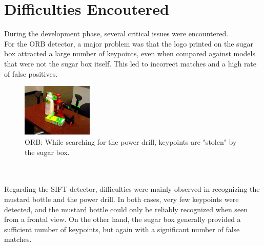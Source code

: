 \documentclass[10.5pt,a4paper]{article}
\begin{document}
\section*{Difficulties Encoutered}
During the development phase, several critical issues were encountered.\\
For the ORB detector, a major problem was that the logo printed on the sugar box attracted a large number of keypoints, even when compared against models that were not the sugar box itself. This led to incorrect matches and a high rate of false positives.
\begin{figure}[h]
    \centering
    \includegraphics[width=0.3\textwidth]{img/power_drill matches_screenshot_28.04.2025.png}
    \caption{ORB: While searching for the power drill, keypoints are "stolen" by the sugar box.}
    \label{fig:prima}
\end{figure}
\\\\
Regarding the SIFT detector, difficulties were mainly observed in recognizing the mustard bottle and the power drill. In both cases, very few keypoints were detected, and the mustard bottle could only be reliably recognized when seen from a frontal view. On the other hand, the sugar box generally provided a sufficient number of keypoints, but again with a significant number of false matches.
\end{document}
